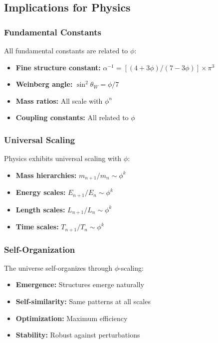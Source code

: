 \documentclass[11pt]{article}
\theoremstyle{definition}
\newcommand{\goldenratio}{\phi}
\begin{document}
\subsection{Implications for Physics}

\subsubsection{Fundamental Constants}

All fundamental constants are related to $\goldenratio$:

\begin{itemize}
\item \textbf{Fine structure constant:} $\alpha^{-1} = [(4+3\goldenratio)/(7-3\goldenratio)]\times\pi^3$
\item \textbf{Weinberg angle:} $\sin^2\theta_W = \goldenratio/7$
\item \textbf{Mass ratios:} All scale with $\goldenratio^n$
\item \textbf{Coupling constants:} All related to $\goldenratio$
\end{itemize}

\subsubsection{Universal Scaling}

Physics exhibits universal scaling with $\goldenratio$:

\begin{itemize}
\item \textbf{Mass hierarchies:} $m_{n+1}/m_n \sim \goldenratio^k$
\item \textbf{Energy scales:} $E_{n+1}/E_n \sim \goldenratio^k$
\item \textbf{Length scales:} $L_{n+1}/L_n \sim \goldenratio^k$
\item \textbf{Time scales:} $T_{n+1}/T_n \sim \goldenratio^k$
\end{itemize}

\subsubsection{Self-Organization}

The universe self-organizes through $\goldenratio$-scaling:

\begin{itemize}
\item \textbf{Emergence:} Structures emerge naturally
\item \textbf{Self-similarity:} Same patterns at all scales
\item \textbf{Optimization:} Maximum efficiency
\item \textbf{Stability:} Robust against perturbations
\end{itemize}
\end{document}
